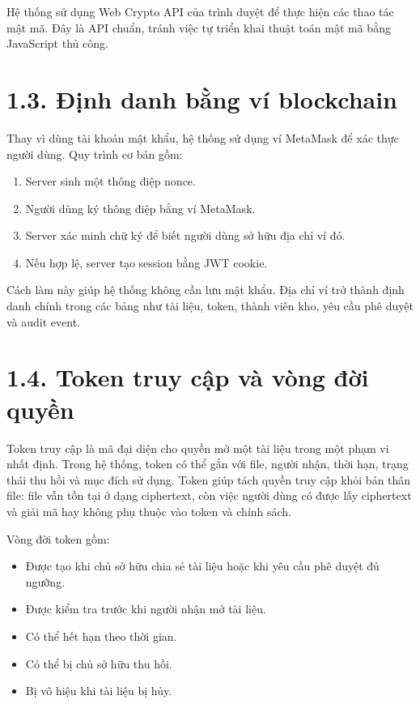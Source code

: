 Hệ thống sử dụng Web Crypto API của trình duyệt để thực hiện các thao tác mật mã. Đây là API chuẩn, tránh việc tự triển khai thuật toán mật mã bằng JavaScript thủ công.

\section*{1.3. Định danh bằng ví blockchain}
{}

Thay vì dùng tài khoản mật khẩu, hệ thống sử dụng ví MetaMask để xác thực người dùng. Quy trình cơ bản gồm:

\begin{enumerate}
  \item Server sinh một thông điệp nonce.
  \item Người dùng ký thông điệp bằng ví MetaMask.
  \item Server xác minh chữ ký để biết người dùng sở hữu địa chỉ ví đó.
  \item Nếu hợp lệ, server tạo session bằng JWT cookie.
\end{enumerate}

Cách làm này giúp hệ thống không cần lưu mật khẩu. Địa chỉ ví trở thành định danh chính trong các bảng như tài liệu, token, thành viên kho, yêu cầu phê duyệt và audit event.

\section*{1.4. Token truy cập và vòng đời quyền}
{}

Token truy cập là mã đại diện cho quyền mở một tài liệu trong một phạm vi nhất định. Trong hệ thống, token có thể gắn với file, người nhận, thời hạn, trạng thái thu hồi và mục đích sử dụng. Token giúp tách quyền truy cập khỏi bản thân file: file vẫn tồn tại ở dạng ciphertext, còn việc người dùng có được lấy ciphertext và giải mã hay không phụ thuộc vào token và chính sách.

Vòng đời token gồm:

\begin{itemize}
  \item Được tạo khi chủ sở hữu chia sẻ tài liệu hoặc khi yêu cầu phê duyệt đủ ngưỡng.
  \item Được kiểm tra trước khi người nhận mở tài liệu.
  \item Có thể hết hạn theo thời gian.
  \item Có thể bị chủ sở hữu thu hồi.
  \item Bị vô hiệu khi tài liệu bị hủy.
\end{itemize}

